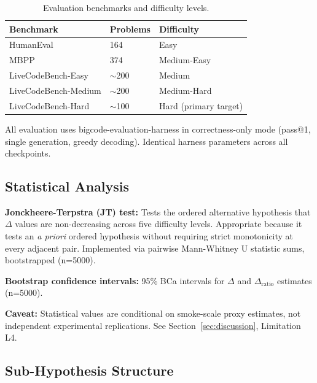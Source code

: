 \begin{table}[h]
\centering
\caption{Evaluation benchmarks and difficulty levels.}
\label{tab:benchmarks}
\begin{tabular}{lll}
\toprule
\textbf{Benchmark} & \textbf{Problems} & \textbf{Difficulty} \\
\midrule
HumanEval \cite{Chen2021HumanEval} & 164 & Easy \\
MBPP \cite{Austin2021MBPP} & 374 & Medium-Easy \\
LiveCodeBench-Easy \cite{Jain2024LiveCodeBench} & $\sim$200 & Medium \\
LiveCodeBench-Medium & $\sim$200 & Medium-Hard \\
LiveCodeBench-Hard & $\sim$100 & Hard (primary target) \\
\bottomrule
\end{tabular}
\end{table}

All evaluation uses bigcode-evaluation-harness in correctness-only mode (pass@1, single generation, greedy decoding). Identical harness parameters across all checkpoints.

\subsection{Statistical Analysis}

\textbf{Jonckheere-Terpstra (JT) test:} Tests the ordered alternative hypothesis that $\Delta$ values are non-decreasing across five difficulty levels. Appropriate because it tests an \textit{a priori} ordered hypothesis without requiring strict monotonicity at every adjacent pair. Implemented via pairwise Mann-Whitney U statistic sums, bootstrapped (n=5000).

\textbf{Bootstrap confidence intervals:} 95\% BCa intervals for $\Delta$ and $\Delta_{\text{ratio}}$ estimates (n=5000).

\textbf{Caveat:} Statistical values are conditional on smoke-scale proxy estimates, not independent experimental replications. See Section~\ref{sec:discussion}, Limitation L4.

\subsection{Sub-Hypothesis Structure}

